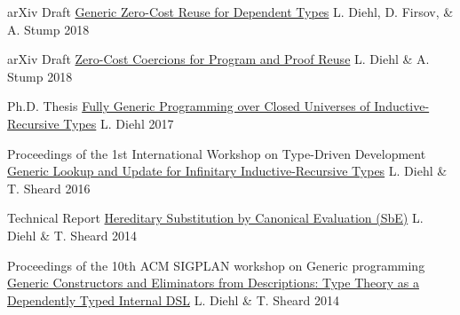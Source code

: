 

\begin{cventries}

  \cventry
    {arXiv Draft} %
    {\href{https://github.com/larrytheliquid/generic-reuse}{Generic Zero-Cost Reuse for Dependent Types}} %
    {L. Diehl, D. Firsov, \& A. Stump} %
    {2018} %
    {}

  \cventry
    {arXiv Draft} %
    {\href{https://github.com/larrytheliquid/zero-cost-coercions}{Zero-Cost Coercions for Program and Proof Reuse}} %
    {L. Diehl \& A. Stump} %
    {2018} %
    {}

  \cventry
    {Ph.D. Thesis} %
    {\href{https://github.com/larrytheliquid/thesis}{Fully Generic Programming over Closed Universes of Inductive-Recursive Types}} %
    {L. Diehl} %
    {2017} %
    {}

  \cventry
    {Proceedings of the 1st International Workshop on Type-Driven Development} %
    {\href{https://github.com/larrytheliquid/infir}{Generic Lookup and Update for Infinitary Inductive-Recursive Types}} %
    {L. Diehl \& T. Sheard} %
    {2016} %
    {}

  \cventry
    {Technical Report} %
    {\href{https://github.com/larrytheliquid/sbe}{Hereditary Substitution by Canonical Evaluation (SbE)}} %
    {L. Diehl \& T. Sheard} %
    {2014} %
    {}

  \cventry
    {Proceedings of the 10th ACM SIGPLAN workshop on Generic programming} %
    {\href{https://github.com/larrytheliquid/generic-elim}{Generic Constructors and Eliminators from Descriptions: {\tiny Type Theory as a Dependently Typed Internal DSL}}} %
    {L. Diehl \& T. Sheard} %
    {2014} %
    {}



\end{cventries}
